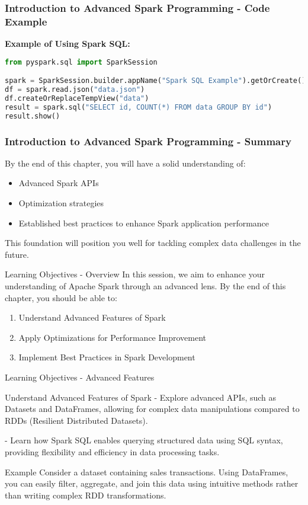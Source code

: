 \documentclass[aspectratio=169]{beamer}
\begin{document}
\begin{frame}[fragile]
    \frametitle{Introduction to Advanced Spark Programming - Code Example}
    \textbf{Example of Using Spark SQL:}
    \begin{lstlisting}[language=Python]
from pyspark.sql import SparkSession

spark = SparkSession.builder.appName("Spark SQL Example").getOrCreate()
df = spark.read.json("data.json")
df.createOrReplaceTempView("data")
result = spark.sql("SELECT id, COUNT(*) FROM data GROUP BY id")
result.show()
    \end{lstlisting}
\end{frame}

\begin{frame}[fragile]
    \frametitle{Introduction to Advanced Spark Programming - Summary}
    By the end of this chapter, you will have a solid understanding of:
    \begin{itemize}
        \item Advanced Spark APIs
        \item Optimization strategies
        \item Established best practices to enhance Spark application performance
    \end{itemize}
    This foundation will position you well for tackling complex data challenges in the future.
\end{frame}

\begin{frame}[fragile]{Learning Objectives - Overview}
    In this session, we aim to enhance your understanding of Apache Spark through an advanced lens. By the end of this chapter, you should be able to:
    \begin{enumerate}
        \item Understand Advanced Features of Spark
        \item Apply Optimizations for Performance Improvement
        \item Implement Best Practices in Spark Development
    \end{enumerate}
\end{frame}

\begin{frame}[fragile]{Learning Objectives - Advanced Features}
    \begin{block}{Understand Advanced Features of Spark}
        - Explore advanced APIs, such as Datasets and DataFrames, allowing for complex data manipulations compared to RDDs (Resilient Distributed Datasets).
        
        - Learn how Spark SQL enables querying structured data using SQL syntax, providing flexibility and efficiency in data processing tasks.
    \end{block}
    
    \begin{block}{Example}
        Consider a dataset containing sales transactions. Using DataFrames, you can easily filter, aggregate, and join this data using intuitive methods rather than writing complex RDD transformations.
    \end{block}
\end{frame}
\end{document}
